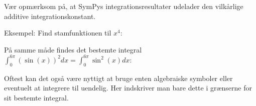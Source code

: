 \documentclass[letterpaper,10pt,english]{jupyterBook}
\begin{document}
Vær opmærksom på, at SymPys integrationsresultater udelader den vilkårlige additive integrationskonstant.

Eksempel: Find stamfunktionen til \(x^4\):

\begin{sphinxVerbatim}[commandchars=\\\{\}]
                                   
      
                  
\end{sphinxVerbatim}

\noindent{}

På samme måde findes det bestemte integral \(\int_0^{6\pi}(\sin(x))^2dx = \int_0^{6\pi}\sin^2(x)dx\):

\begin{sphinxVerbatim}[commandchars=\\\{\}]
                     
         
\end{sphinxVerbatim}

\noindent{}

Oftest kan det også være nyttigt at bruge enten algebraiske symboler eller eventuelt at integrere til uendelig. Her indskriver man bare dette i grænserne for sit bestemte integral.

\begin{sphinxVerbatim}[commandchars=\\\{\}]
     
   
\end{sphinxVerbatim}
\end{document}
